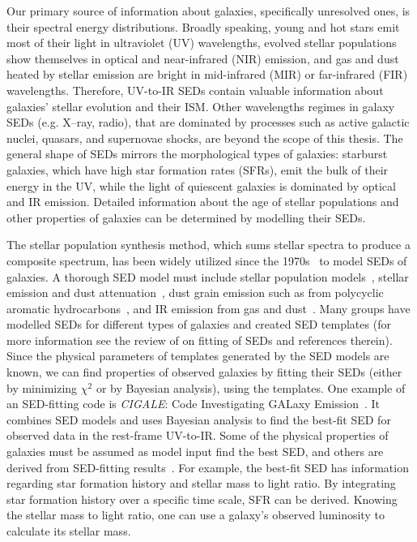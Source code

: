 Our primary source of information about galaxies, specifically unresolved ones, is their spectral energy distributions. 
Broadly speaking, young and hot stars emit most of their light in ultraviolet (UV) wavelengths, evolved stellar populations show themselves in optical and near-infrared (NIR) emission, and gas and dust heated by stellar emission are bright in mid-infrared (MIR) or far-infrared (FIR) wavelengths.
Therefore, UV-to-IR SEDs contain valuable information about galaxies' stellar evolution and their ISM. 
Other wavelengths regimes in galaxy SEDs (e.g. X--ray, radio), that are dominated by processes such as active galactic nuclei, quasars, and supernovae shocks, are beyond the scope of this thesis.
The general shape of SEDs mirrors the morphological types of galaxies: starburst galaxies, which have high star formation rates (SFRs), emit the bulk of their energy in the UV, while the light of quiescent galaxies is dominated by optical and IR emission. 
Detailed information about the age of stellar populations and other properties of galaxies can be determined by modelling their SEDs.

The stellar population synthesis method, which sums stellar spectra to produce a composite spectrum, has been widely utilized since the 1970s~\citep[e.g.][]{Tinsley72,Searle73} to model SEDs of galaxies.
A thorough SED model must include stellar population models~\citep[e.g.][]{Bruzual93,Bruzual03,Maraston05}, stellar emission and dust attenuation~\citep[e.g.][]{Calzetti00,Dopita05}, dust grain emission such as from polycyclic aromatic hydrocarbons~\citep[PAHs; e.g.][and references therein]{Tielens08}, and IR emission from gas and dust~\citep[e.g.][]{Chary01,Dale02,Lagache03,Lagache04,Smith07a,Draine07}.
Many groups have modelled SEDs for different types of galaxies and created SED templates (for more information see the review of \cite{Walcher11} on fitting of SEDs and references therein).
Since the physical parameters of templates generated by the SED models are known, we can find properties of observed galaxies by fitting their SEDs (either by minimizing $\chi^2$ or by Bayesian analysis), using the templates.
One example of an SED-fitting code is {\em CIGALE}: Code Investigating GALaxy Emission~\citep{Noll09}.
It combines SED models and uses Bayesian analysis to find the best-fit SED for observed data in the rest-frame UV-to-IR.
Some of the physical properties of galaxies must be assumed as model input find the best SED, and others are derived from SED-fitting results~\citep[see ][for more detail]{Walch08}.
For example, the best-fit SED has information regarding star formation history and stellar mass to light ratio.
By integrating star formation history over a specific time scale, SFR can be derived.
Knowing the stellar mass to light ratio, one can use a galaxy's observed luminosity to calculate its stellar mass.

